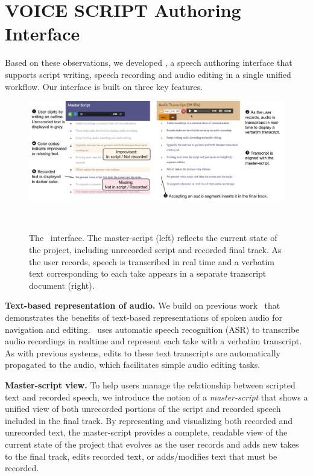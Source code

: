 \section{VOICE SCRIPT Authoring Interface}

Based on these observations, we developed \systemname, a speech authoring interface that supports script writing, speech recording and audio editing in a single unified workflow. Our interface is built on three key features.

\begin{figure}
  \centering
  \includegraphics[width=2.0\columnwidth]{figures/ui_aligned}
  \caption{The \systemname\ interface. The master-script (left)  reflects the current state of
the project, including unrecorded script and recorded final track. As the user records, speech is transcribed in real
time and a verbatim text corresponding to each take appears in
a separate transcript document (right).}~\label{fig:ui_aligned}
\end{figure}

\textbf{Text-based representation of audio.} We build on previous work~\cite{casares2002simplifying,whittaker2004semantic,berthouzoz2012tools,rubin2013content} that demonstrates the benefits of text-based representations of spoken audio for navigation and editing. \systemname\ uses automatic speech recognition (ASR) to transcribe audio recordings in realtime and represent each take with a verbatim transcript. As with previous systems, edits to these text transcripts are automatically propagated to the audio, which facilitates simple audio editing tasks. 

\textbf{Master-script view.} To help users manage the relationship between scripted text and recorded speech, we introduce the notion of a \emph{master-script} that shows a unified view of both unrecorded portions of the script and recorded speech included in the final track. By representing and visualizing both recorded and unrecorded text, the master-script provides a complete, readable view of the current state of the project that evolves as the user records and adds new takes to the final track, edits recorded text, or adds/modifies text that must be recorded. 

